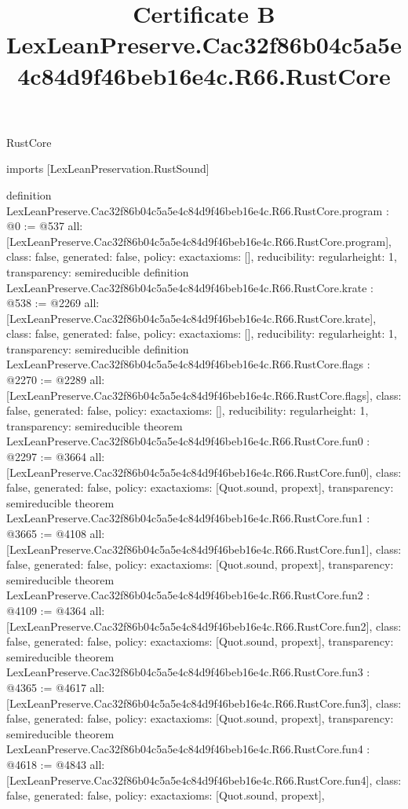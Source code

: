 \begin{lexlean}{RustCore}
\title{Certificate B LexLeanPreserve.Cac32f86b04c5a5e4c84d9f46beb16e4c.R66.RustCore}
\begin{coremodule}
imports [LexLeanPreservation.RustSound]

definition LexLeanPreserve.Cac32f86b04c5a5e4c84d9f46beb16e4c.R66.RustCore.program : @0 := @537 {
  all: [LexLeanPreserve.Cac32f86b04c5a5e4c84d9f46beb16e4c.R66.RustCore.program],
  class: false,
  generated: false,
  policy: exact{axioms: []},
  reducibility: regular{height: 1},
  transparency: semireducible
}
definition LexLeanPreserve.Cac32f86b04c5a5e4c84d9f46beb16e4c.R66.RustCore.krate : @538 := @2269 {
  all: [LexLeanPreserve.Cac32f86b04c5a5e4c84d9f46beb16e4c.R66.RustCore.krate],
  class: false,
  generated: false,
  policy: exact{axioms: []},
  reducibility: regular{height: 1},
  transparency: semireducible
}
definition LexLeanPreserve.Cac32f86b04c5a5e4c84d9f46beb16e4c.R66.RustCore.flags : @2270 := @2289 {
  all: [LexLeanPreserve.Cac32f86b04c5a5e4c84d9f46beb16e4c.R66.RustCore.flags],
  class: false,
  generated: false,
  policy: exact{axioms: []},
  reducibility: regular{height: 1},
  transparency: semireducible
}
theorem LexLeanPreserve.Cac32f86b04c5a5e4c84d9f46beb16e4c.R66.RustCore.fun0 : @2297 := @3664 {
  all: [LexLeanPreserve.Cac32f86b04c5a5e4c84d9f46beb16e4c.R66.RustCore.fun0],
  class: false,
  generated: false,
  policy: exact{axioms: [Quot.sound, propext]},
  transparency: semireducible
}
theorem LexLeanPreserve.Cac32f86b04c5a5e4c84d9f46beb16e4c.R66.RustCore.fun1 : @3665 := @4108 {
  all: [LexLeanPreserve.Cac32f86b04c5a5e4c84d9f46beb16e4c.R66.RustCore.fun1],
  class: false,
  generated: false,
  policy: exact{axioms: [Quot.sound, propext]},
  transparency: semireducible
}
theorem LexLeanPreserve.Cac32f86b04c5a5e4c84d9f46beb16e4c.R66.RustCore.fun2 : @4109 := @4364 {
  all: [LexLeanPreserve.Cac32f86b04c5a5e4c84d9f46beb16e4c.R66.RustCore.fun2],
  class: false,
  generated: false,
  policy: exact{axioms: [Quot.sound, propext]},
  transparency: semireducible
}
theorem LexLeanPreserve.Cac32f86b04c5a5e4c84d9f46beb16e4c.R66.RustCore.fun3 : @4365 := @4617 {
  all: [LexLeanPreserve.Cac32f86b04c5a5e4c84d9f46beb16e4c.R66.RustCore.fun3],
  class: false,
  generated: false,
  policy: exact{axioms: [Quot.sound, propext]},
  transparency: semireducible
}
theorem LexLeanPreserve.Cac32f86b04c5a5e4c84d9f46beb16e4c.R66.RustCore.fun4 : @4618 := @4843 {
  all: [LexLeanPreserve.Cac32f86b04c5a5e4c84d9f46beb16e4c.R66.RustCore.fun4],
  class: false,
  generated: false,
  policy: exact{axioms: [Quot.sound, propext]},
}
\end{coremodule}
\end{lexlean}
